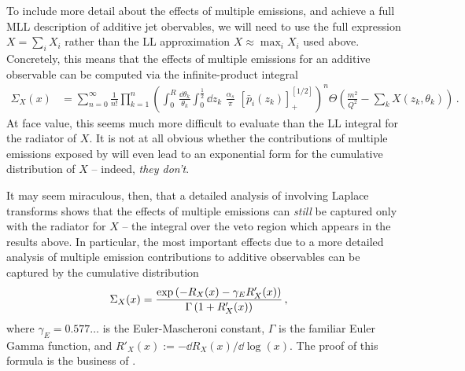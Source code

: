 To include more detail about the effects of multiple emissions, and achieve a full MLL description of additive jet obervables, we will need to use the full expression \(X = \sum_i X_i\) rather than the LL approximation \(X \approx \max_i X_i\) used above.
%
Concretely, this means that the effects of multiple emissions for an additive observable can be computed via the infinite-product integral
\begin{align}
    \label{eq:multiple-emissions}
    \Sigma_X(x)
    &=
    \sum_{n = 0}^{\infty}
    \frac{1}{n!}
    \prod_{k = 1}^n
    \left(
        \int_0^R \frac{\dd\theta_k}{\theta_k}
        \int_0^{\frac{1}{2}} \dd z_k
        \,\,
        \frac{\alpha_s}{\pi}
        \,\,
        [\bar{p}_i(z_k)]_+^{[1/2]}
    \right)^n
    \Theta\left(
        \frac{m^2}{Q^2} - \sum_k X(z_k, \theta_k)
    \right)
    \,.
\end{align}
%
At face value, this seems much more difficult to evaluate than the LL integral for the radiator of \(X\).
%
It is not at all obvious whether the contributions of multiple emissions exposed by  will even lead to an exponential form for the cumulative distribution of \(X\) 
--
indeed, \textit{they don't}.

It may seem miraculous, then, that a detailed analysis of \Eq{} involving Laplace transforms shows that the effects of multiple emissions can \textit{still} be captured only with the radiator for \(X\) -- the integral over the veto region which appears in the  results above.
%
In particular, the most important effects due to a more detailed analysis of multiple emission contributions to additive observables can be captured by the cumulative distribution
\begin{align}
    \Sigma_X(x)
    &=
    \frac{\exp\left(-R_X(x) - \gamma_E R'_X(x)\right)}{\Gamma\left(1 + R'_X(x)\right)}
    \,,
\end{align}
where \(\gamma_E=0.577\dots\) is the Euler-Mascheroni constant, \(\Gamma\) is the familiar Euler Gamma function, and \(R'_X(x) := -\dd R_X(x) / \dd \log(x)\).
%
The proof of this formula is the business of .
%



